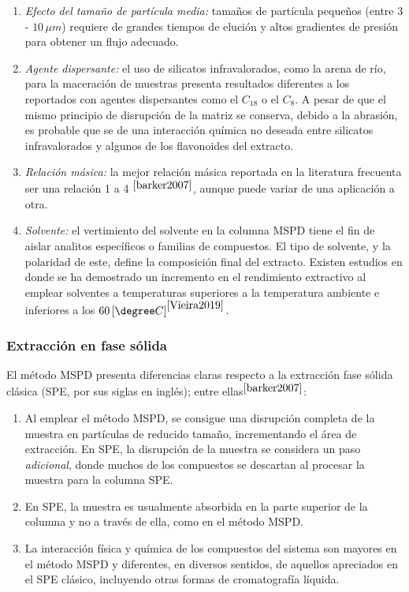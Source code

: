 \begin{enumerate}
	\item \textit{Efecto del tama\~no de part\'icula media:} tama\~nos de part\'icula peque\~nos (entre $3$ - $10 \, \mu m$) requiere de grandes tiempos de eluci\'on y altos gradientes de presi\'on para obtener un flujo adecuado. 
	\item \textit{Agente dispersante:} el uso de silicatos infravalorados, como la arena de r\'io, para la maceraci\'on de muestras presenta resultados diferentes a los reportados con agentes dispersantes como el $C_{18}$ o el $C_8$. A pesar de que el mismo principio de disrupci\'on de la matriz se conserva, debido a la abrasi\'on, es probable que se de una interacci\'on qu\'imica no deseada entre silicatos infravalorados y algunos de los flavonoides del extracto.
	\item \textit{Relaci\'on m\'asica:} la mejor relaci\'on m\'asica reportada en la literatura frecuenta ser una relaci\'on 1 a 4 $^{\cite{barker2007}}$, aunque puede variar de una aplicaci\'on a otra. 
	\item \textit{Solvente:} el vertimiento del solvente en la columna MSPD tiene el fin de aislar analitos espec\'ificos o familias de compuestos. El tipo de solvente, y la polaridad de este, define la composici\'on final del extracto. Existen estudios en donde se ha demostrado un incremento en el rendimiento extractivo al emplear solventes a temperaturas superiores a la temperatura ambiente e inferiores a los $60 \left[ \degree C \right]^{\cite{Vieira2019}}$. 
\end{enumerate}

\subsubsection{Extracci\'on en fase s\'olida}

\noindent
\justify

El m\'etodo MSPD presenta diferencias claras respecto a la extracci\'on fase s\'olida cl\'asica (SPE, por sus siglas en ingl\'es); entre ellas$^{\cite{barker2007}}$:
\begin{enumerate}
	\item Al emplear el m\'etodo MSPD, se consigue una disrupci\'on completa de la muestra en part\'iculas de reducido tama\~no, incrementando el \'area de extracci\'on. En SPE, la disrupci\'on de la muestra se considera un paso \textit{adicional}, donde muchos de los compuestos se descartan al procesar la muestra para la columna SPE. 
	\item En SPE, la muestra es usualmente absorbida en la parte superior de la columna y no a trav\'es de ella, como en el m\'etodo MSPD.
	\item La interacci\'on f\'isica y qu\'imica de los compuestos del sistema son mayores en el m\'etodo MSPD y diferentes, en diversos sentidos, de aquellos apreciados en el SPE cl\'asico, incluyendo otras formas de cromatograf\'ia l\'iquida.
\end{enumerate}